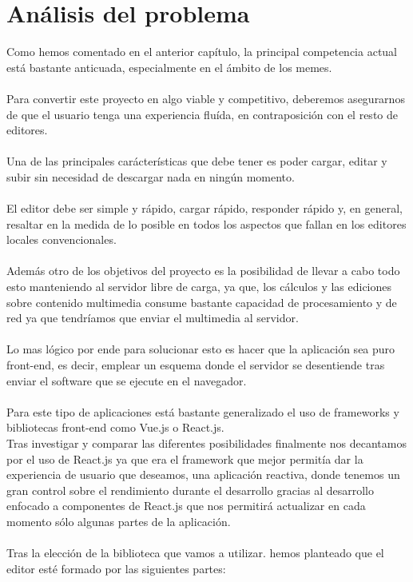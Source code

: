 \chapter{Análisis del problema}

Como hemos comentado en el anterior capítulo, la principal competencia actual está 
bastante anticuada, especialmente en el ámbito de los memes.
\\\\
Para convertir este proyecto en algo viable y competitivo, deberemos asegurarnos de que
el usuario tenga una experiencia fluída, en contraposición con el resto de editores.
\\\\
Una de las principales carácterísticas que debe tener es poder cargar, editar y subir sin
necesidad de descargar nada en ningún momento.
\\\\
El editor debe ser simple y rápido, cargar rápido, responder rápido
y, en general, resaltar en la medida de lo posible en todos los aspectos 
que fallan en los editores locales convencionales.
\\\\
Además otro de los objetivos del proyecto es la posibilidad de llevar a 
cabo todo esto manteniendo al servidor libre de carga, ya que, los cálculos
y las ediciones sobre contenido multimedia consume bastante capacidad de 
procesamiento y de red ya que tendríamos que enviar el multimedia al servidor.
\\\\
Lo mas lógico por ende para solucionar esto es hacer que la aplicación sea 
puro front-end, es decir, emplear un esquema donde el servidor se desentiende
tras enviar el software que se ejecute en el navegador.
\\\\
Para este tipo de aplicaciones está bastante generalizado el uso de frameworks 
y bibliotecas front-end como Vue.js o React.js.
\\
Tras investigar y comparar las diferentes posibilidades finalmente nos decantamos
por el uso de React.js ya que era el framework que mejor permitía dar
la experiencia de usuario que deseamos, una aplicación reactiva, donde tenemos
un gran control sobre el rendimiento durante el desarrollo gracias al 
desarrollo enfocado a componentes de React.js que nos permitirá actualizar
en cada momento sólo algunas partes de la aplicación.  
\\\\
Tras la elección de la biblioteca que vamos a utilizar.
hemos planteado que el editor esté formado por las siguientes partes:

